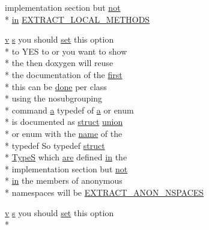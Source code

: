 \begin{DoxyCompactItemize}
implementation section but \hyperlink{uavobjecttemplate_8m_acf8758da9d0019183b0d213755711ee7}{not} \\*
\hyperlink{glext_8h_a83ad0ee7f1e06b59c90271716e689080}{in} \hyperlink{sdlgamepad_8dox_a7274082691ced043d976dbd8b0e8c608}{E\-X\-T\-R\-A\-C\-T\-\_\-\-L\-O\-C\-A\-L\-\_\-\-M\-E\-T\-H\-O\-D\-S}
\item 
\hyperlink{glext_8h_a14cfbe2fc2234f5504618905b69d1e06}{v} \hyperlink{glext_8h_ad585a1393cfa368fa9dc3d8ebff640d5}{s} you should \hyperlink{analyze_raw_8m_a11671e12e7b3fc5881313758d6cc0b45}{set} this option \\*
to Y\-E\-S to or you want to show \\*
the then doxygen will reuse \\*
the documentation of the \hyperlink{glext_8h_a970a385f6f880f2b620451db4ca4299a}{first} \\*
this can be \hyperlink{qxtslotjob_8h_afd848a85523ad0ba77464879add9c332}{done} per class \\*
using the nosubgrouping \\*
command \hyperlink{glext_8h_ac8729153468b5dcf13f971b21d84d4e5}{a} typedef of \hyperlink{glext_8h_ac8729153468b5dcf13f971b21d84d4e5}{a} or enum \\*
is documented as \hyperlink{sdlgamepad_8dox_aba655c5729da86df745f0c8e7f9ba8d2}{struct} \hyperlink{sdlgamepad_8dox_a68000add3c95d09ceb97c3079515907d}{union} \\*
or enum with the \hyperlink{glext_8h_ad977737dfc9a274a62741b9500c49a32}{name} of the \\*
typedef So typedef \hyperlink{sdlgamepad_8dox_aba655c5729da86df745f0c8e7f9ba8d2}{struct} \\*
\hyperlink{sdlgamepad_8dox_a25dd1c015abaf1e4f2c6879012f4f170}{Type\-S} which \hyperlink{sdlgamepad_8dox_a6d0965b20c4eb2235e8f9f5f0e5193ae}{are} defined \hyperlink{glext_8h_a83ad0ee7f1e06b59c90271716e689080}{in} the \\*
implementation section but \hyperlink{uavobjecttemplate_8m_acf8758da9d0019183b0d213755711ee7}{not} \\*
\hyperlink{glext_8h_a83ad0ee7f1e06b59c90271716e689080}{in} the members of anonymous \\*
namespaces will be \hyperlink{sdlgamepad_8dox_a7e1f20bfa451cb50f83a07ffe19863e7}{E\-X\-T\-R\-A\-C\-T\-\_\-\-A\-N\-O\-N\-\_\-\-N\-S\-P\-A\-C\-E\-S}
\item 
\hyperlink{glext_8h_a14cfbe2fc2234f5504618905b69d1e06}{v} \hyperlink{glext_8h_ad585a1393cfa368fa9dc3d8ebff640d5}{s} you should \hyperlink{analyze_raw_8m_a11671e12e7b3fc5881313758d6cc0b45}{set} this option \\*

\end{DoxyCompactItemize}
